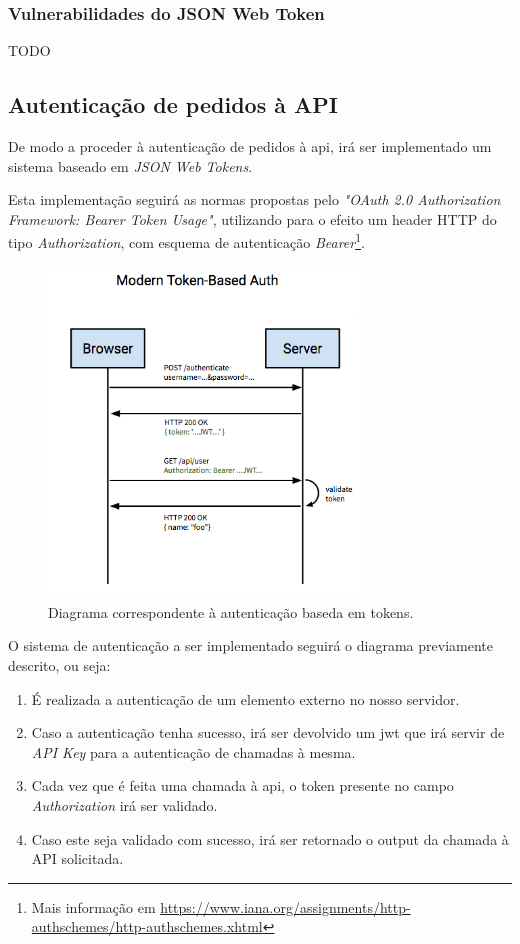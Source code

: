 \cleardoublepage
\subsubsection{Vulnerabilidades do JSON Web Token}

TODO

\cleardoublepage
\subsection{Autenticação de pedidos à API}

De modo a proceder à autenticação de pedidos à \gls{api}, irá ser implementado um sistema baseado em \emph{JSON Web Tokens}.

Esta implementação seguirá as normas propostas pelo \emph{"OAuth 2.0 Authorization Framework: Bearer Token Usage"}\cite{rfc6750}, utilizando para o efeito um header HTTP do tipo \emph{Authorization}, com esquema de autenticação \emph{Bearer}\footnote{Mais informação em \url{https://www.iana.org/assignments/http-authschemes/http-authschemes.xhtml}}.

\begin{figure}[h]
    \centering
    \includegraphics[width=0.75\textwidth]{img/jwt/diagramafluxoJWT.png}
    \caption{Diagrama correspondente à autenticação baseda em tokens. \cite{jwtDiagram}}
\end{figure}

O sistema de autenticação a ser implementado seguirá o diagrama previamente descrito, ou seja:

\begin{enumerate}
    \item É realizada a autenticação de um elemento externo no nosso servidor.
    \item Caso a autenticação tenha sucesso, irá ser devolvido um \gls{jwt} que irá servir de \emph{API Key} para a autenticação de chamadas à mesma.
    \item Cada vez que é feita uma chamada à \gls{api}, o token presente no campo \emph{Authorization} irá ser validado.
    \item Caso este seja validado com sucesso, irá ser retornado o output da chamada à API solicitada.
\end{enumerate}

